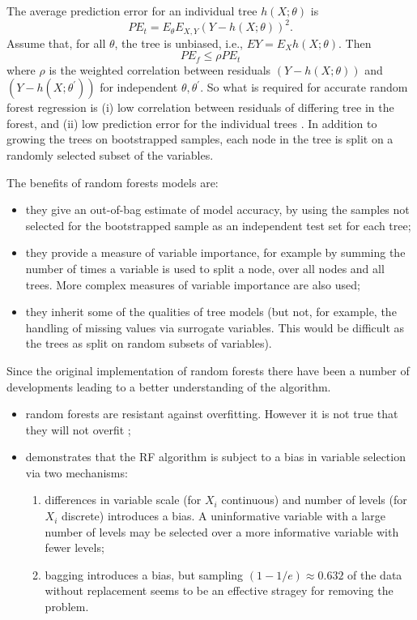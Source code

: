 \documentclass[10pt,a4paper]{article}  %
\begin{document}
The average prediction error for an individual tree $h(X; \theta)$ is
\begin{equation}
PE_t = E_\theta E_{X,Y} (Y-h(X; \theta))^2.
\end{equation}
Assume that, for all  $\theta$, the tree is unbiased, i.e., $EY= E_X h(X; \theta)$. Then
\begin{equation}
PE_f \leq \rho PE_t
\end{equation}
where $\rho$ is the weighted correlation between residuals $(Y-h(X;\theta))$ and $(Y-h(X;\theta^\prime))$ for independent $\theta,
\theta^\prime$.  
So what is required for  accurate random forest regression is (i) low correlation between residuals of differing tree in
the forest, and (ii) low prediction error for the individual trees \cite{Segal.2004}. In addition to growing the trees
on  bootstrapped samples, each node in the tree is split on a randomly selected subset of the variables.

The benefits of random forests models are:
  \begin{itemize}
  \item they give an out-of-bag estimate of model accuracy, by using the samples not selected for the bootstrapped sample
    as an independent test set for each tree;
  \item they provide a measure of variable importance, for example by summing the number of times a variable is used to
    split a node, over all nodes and all trees. More complex measures of variable importance are also used;
  \item they inherit some of the qualities of tree models (but not, for example, the handling of missing values via surrogate
    variables. This would be difficult as the trees as split on random subsets of variables).
  \end{itemize}

Since the original implementation of random forests there have been a number of developments leading to a better understanding of
the algorithm. 
\begin{itemize}
\item random forests are resistant against overfitting. However it is not true that they will not overfit \cite[]{Segal.2004};
\item \cite{Strobl.et.al.2007} demonstrates that the RF algorithm is subject to a bias in variable selection via two mechanisms:
  \begin{enumerate}
  \item differences in variable scale (for $X_i$ continuous) and number of levels (for $X_i$ discrete) introduces a
    bias. A uninformative variable with a large number of levels may be selected over a more informative variable with
    fewer levels;
  \item bagging introduces a bias, but sampling $(1- 1/e) \approx 0.632$  of the data without replacement seems to be an
    effective stragey for removing the problem.
  \end{enumerate}
\end{itemize} 
\end{document}
